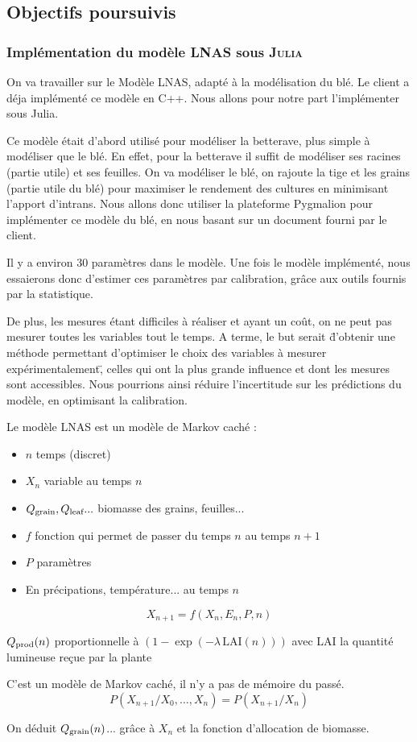 \subsection{Objectifs poursuivis}
\subsubsection{Implémentation du modèle LNAS sous \textsc{Julia}}
On va travailler sur le Modèle LNAS, adapté à la modélisation du blé. 
Le client a déja implémenté ce modèle en C++. 
Nous allons pour notre part l'implémenter sous Julia.

Ce modèle était d'abord utilisé pour modéliser la betterave, 
plus simple à modéliser que le blé. 
En effet, pour la betterave il suffit de modéliser 
ses racines (partie utile) et ses feuilles.
On va modéliser le blé, on rajoute la tige et les grains (partie utile du blé)
pour maximiser le rendement des cultures en minimisant l’apport d’intrans.
Nous allons donc utiliser la plateforme Pygmalion pour implémenter ce modèle du blé,
en nous basant sur un document fourni par le client.

Il y a environ 30 paramètres dans le modèle. Une fois le modèle implémenté, nous essaierons donc d'estimer ces paramètres par calibration, grâce aux outils fournis par la statistique.

De plus, les mesures étant difficiles à réaliser et ayant un coût, on ne peut pas mesurer toutes les variables tout le temps. A terme, le but serait \"d'obtenir une méthode permettant d'optimiser le choix des variables à mesurer expérimentalement\", celles qui ont la plus grande influence et dont les mesures sont accessibles. Nous pourrions ainsi réduire l'incertitude sur les prédictions du modèle, en optimisant la calibration.


Le modèle LNAS est un modèle de Markov caché : 
\begin{itemize}
  \item $n$  temps (discret)     
  \item $X_n$ variable au temps $n$       
  \item $Q_{\text{grain}}, Q_{\text{leaf}}... $ biomasse des grains, feuilles...      
  \item $f$ fonction qui permet de passer du temps $n$ au temps $n+1$     
  \item $P$ paramètres      
  \item En précipations, température... au temps $n$
\end{itemize}

\begin{equation}
  X_{n+1} = f(X_n,E_n,P,n)
\end{equation} 

$Q_{\text{prod}}(n)$ proportionnelle à $(1-\exp{(-\lambda \, \text{LAI}(n))})$ 
avec LAI la quantité lumineuse reçue par la plante

C’est un modèle de Markov caché, il n'y a pas de mémoire du passé.
\[
  P(X_{n+1}/X_0,…,X_n) = P(X_{n+1} / X_n) 
\] 

On déduit $Q_{\text{grain}}(n)$... grâce à $X_n$ et la fonction d'allocation de biomasse.
